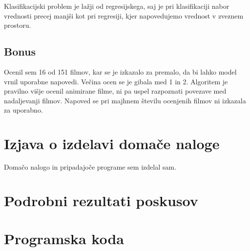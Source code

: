 \documentclass[a4paper,11pt]{article}
\begin{document}
Klasifikacijski problem je lažji od regresijskega, saj je pri klasifikaciji nabor vrednosti
precej manjši kot pri regresiji, kjer napovedujemo vrednost v zveznem prostoru.

\subsection{Bonus}
Ocenil sem 16 od 151 filmov, kar se je izkazalo za premalo, da bi lahko model vrnil uporabne
napovedi. Večina ocen se je gibala med 1 in 2. Algoritem je pravilno višje ocenil animirane filme,
ni pa uspel razpoznati povezave med nadaljevanji filmov. Napoved se pri majhnem številu ocenjenih
filmov ni izkazala za uporabno.

\section{Izjava o izdelavi domače naloge}
Domačo nalogo in pripadajoče programe sem izdelal sam.

\appendix
\appendixpage
\section{\label{app-res}Podrobni rezultati poskusov}




\section{\label{app-code}Programska koda}






\end{document}
